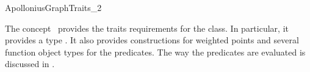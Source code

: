 

\begin{ccRefConcept}{ApolloniusGraphTraits_2}

\ccDefinition
  
The concept \ccRefName\ provides the traits requirements for the
 class. In particular,
it provides a type . It also provides
constructions for weighted points and several function object
types for the predicates. The way the predicates are evaluated is
discussed in \cite{ke-ppawv-02,ke-rctac-03}.


\end{ccRefConcept}
